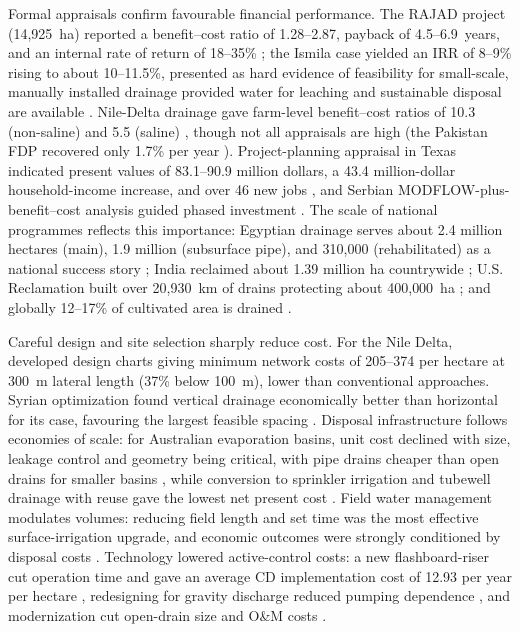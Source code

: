 \documentclass[11pt]{article}
\begin{document}
Formal appraisals confirm favourable financial performance. The RAJAD project
(14{,}925~ha) reported a benefit--cost ratio of 1.28--2.87, payback of
4.5--6.9~years, and an internal rate of return of 18--35\%
\parencite{Gopalakrishnan2007}; the Ismila case yielded an IRR of 8--9\% rising to
about 10--11.5\%, presented as hard evidence of feasibility for small-scale,
manually installed drainage provided water for leaching and sustainable disposal
are available \parencite{Datta2000,Datta2002}. Nile-Delta drainage gave farm-level
benefit--cost ratios of 10.3 (non-saline) and 5.5 (saline) \parencite{Wichelns2002},
though not all appraisals are high (the Pakistan FDP recovered only 1.7\% per year
\parencite{Ghumman2011}). Project-planning appraisal in Texas indicated present
values of 83.1--90.9 million dollars, a 43.4 million-dollar household-income
increase, and over 46 new jobs \parencite{ROBINSON1992}, and Serbian
MODFLOW-plus-benefit--cost analysis guided phased investment
\parencite{Bozic2014}. The scale of national programmes reflects this importance:
Egyptian drainage serves about 2.4 million hectares (main), 1.9 million
(subsurface pipe), and 310{,}000 (rehabilitated) as a national success story
\parencite{AbdelDayem2007}; India reclaimed about 1.39 million ha countrywide
\parencite{Gopalakrishnan2007}; U.S. Reclamation built over 20{,}930~km of drains
protecting about 400{,}000~ha \parencite{TeKrony2004}; and globally 12--17\% of
cultivated area is drained \parencite{Valipour2014}.

Careful design and site selection sharply reduce cost. For the Nile Delta,
\textcite{Gabr2024} developed design charts giving minimum network costs of
205--374 per hectare at 300~m lateral length (37\% below 100~m), lower than
conventional approaches. Syrian optimization found vertical drainage economically
better than horizontal for its case, favouring the largest feasible spacing
\parencite{Bakour2021}. Disposal infrastructure follows economies of scale: for
Australian evaporation basins, unit cost declined with size, leakage control and
geometry being critical, with pipe drains cheaper than open drains for smaller
basins \parencite{Singh2001}, while conversion to sprinkler irrigation and
tubewell drainage with reuse gave the lowest net present cost
\parencite{Bethune2008}. Field water management modulates volumes: reducing field
length and set time was the most effective surface-irrigation upgrade, and
economic outcomes were strongly conditioned by disposal costs
\parencite{HANSON1994}. Technology lowered active-control costs: a new
flashboard-riser cut operation time and gave an average CD implementation cost of
12.93 per year per hectare \parencite{Napierala2024}, redesigning for gravity
discharge reduced pumping dependence \parencite{Imran2021}, and modernization cut
open-drain size and O\&M costs \parencite{Ritzema2023}.
\end{document}
